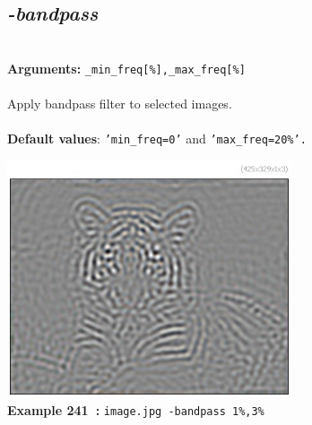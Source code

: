 \documentclass[a4paper,11pt,twoside]{book}
\begin{document}
\subsection{\emph{-bandpass} }\vspace*{-0.5em}
~\\\textbf{Arguments: } 
{\small \texttt{\_min\_freq[\%],\_max\_freq[\%]}}\\~\\
Apply bandpass filter to selected images.
~\\~\\\textbf{Default values}: {\small \texttt{'min\_freq=0'} and \texttt{'max\_freq=20\%'.}}
\begin{center}\includegraphics[keepaspectratio=true,height=7cm,width=\textwidth]{img/gmic_def241.jpg}\\
{\footnotesize \textbf{Example 241~:} \texttt{image.jpg -bandpass 1\%,3\%}}
\end{center}
\end{document}
